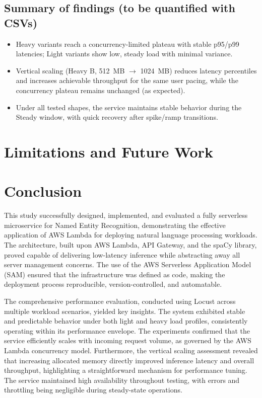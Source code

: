 \documentclass[11pt,a4paper]{article}
\begin{document}
\subsection{Summary of findings (to be quantified with CSVs)}
\begin{itemize}
  \item Heavy variants reach a concurrency-limited plateau with stable p95/p99 latencies; Light variants show low, steady load with minimal variance.
  \item Vertical scaling (Heavy B, \SI{512}{MB} $\rightarrow$ \SI{1024}{MB}) reduces latency percentiles and increases achievable throughput for the same user pacing, while the concurrency plateau remains unchanged (as expected).
  \item Under all tested shapes, the service maintains stable behavior during the Steady window, with quick recovery after spike/ramp transitions.
\end{itemize}

\section{Limitations and Future Work}


\section{Conclusion}
This study successfully designed, implemented, and evaluated a fully serverless microservice for Named Entity Recognition, demonstrating the effective application of AWS Lambda for deploying natural language processing workloads. The architecture, built upon AWS Lambda, API Gateway, and the spaCy library, proved capable of delivering low-latency inference while abstracting away all server management concerns. The use of the AWS Serverless Application Model (SAM) ensured that the infrastructure was defined as code, making the deployment process reproducible, version-controlled, and automatable.

The comprehensive performance evaluation, conducted using Locust across multiple workload scenarios, yielded key insights. The system exhibited stable and predictable behavior under both light and heavy load profiles, consistently operating within its performance envelope. The experiments confirmed that the service efficiently scales with incoming request volume, as governed by the AWS Lambda concurrency model. Furthermore, the vertical scaling assessment revealed that increasing allocated memory directly improved inference latency and overall throughput, highlighting a straightforward mechanism for performance tuning. The service maintained high availability throughout testing, with errors and throttling being negligible during steady-state operations.
\end{document}
